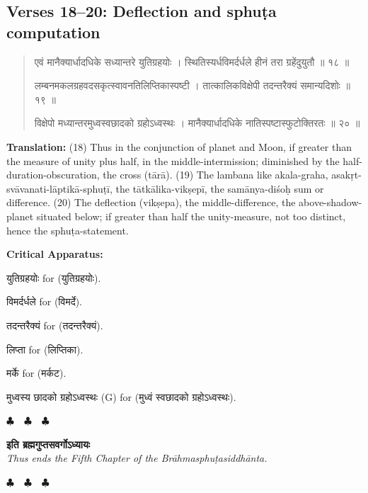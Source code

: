 \documentclass[11pt,a4paper]{article}
\newcommand{\dev}[1]{{\devanagarifont #1}}
\newenvironment{sanskritverse}{%
  \begin{quote}%
  \devanagarifont%
  \setlength{\leftmargin}{2em}%
}{\end{quote}}
\newenvironment{variants}{%
  \small%
  \color{varecolor}%
  \list{}{\leftmargin=2em\itemindent=-1em}%
}{\endlist}
\newcommand{\chapterend}{%
  \begin{center}%
  \textcolor{endmarkcolor}{$\clubsuit$~~$\clubsuit$~~$\clubsuit$}%
  \end{center}%
}
\begin{document}
\subsection*{Verses 18--20: Deflection and sphuṭa computation}

\begin{sanskritverse}
\dev{एवं मानैक्यार्धादधिके सध्यान्तरे युतिग्रहयोः} ।
\dev{स्थितिस्यर्धविमर्दर्धले हीनं तरा ग्रहेंदुयुतौ ॥ १८ ॥}

\dev{लम्बनमकलग्रहवदसकृत्स्वावनतिलिप्तिकास्पष्टी} ।
\dev{तात्कालिकविक्षेपी तदन्तरैक्यं समान्यदिशोः ॥ १९ ॥}

\dev{विक्षेपो मध्यान्तरमुध्वस्वछादको ग्रहोऽध्वस्थः} ।
\dev{मानैक्यार्धादधिके नातिस्पष्टास्फुटोक्तिरतः ॥ २० ॥}
\end{sanskritverse}

\textbf{Translation:} (18) Thus in the conjunction of planet and Moon, if greater 
than the measure of unity plus half, in the middle-intermission; diminished by the 
half-duration-obscuration, the cross (tārā). (19) The lambana like akala-graha, 
asakṛt-svāvanati-lāptikā-sphuṭī, the tātkālika-vikṣepī, the samānya-diśoḥ sum or 
difference. (20) The deflection (vikṣepa), the middle-difference, the above-shadow-planet 
situated below; if greater than half the unity-measure, not too distinct, hence 
the sphuṭa-statement.

\textcolor{varecolor}{\textbf{Critical Apparatus:}}
\begin{variants}
\item[18.1] \dev{युतिग्रहयोः} \dev{for} (\dev{युतिग्रहयोः}).
\item[18.2] \dev{विमर्दर्धले} \dev{for} (\dev{विमर्दे}).
\item[19.1] \dev{तदन्तरैक्यं} \dev{for} (\dev{तदन्तरैक्यं}).
\item[19.2] \dev{लिप्ता} \dev{for} (\dev{लिप्तिका}).
\item[20.1] \dev{मर्के} \dev{for} (\dev{मर्कट}).
\item[20.2] \dev{मुध्वस्य छादको ग्रहोऽध्वस्थः} (G) \dev{for} (\dev{मुध्वं स्वछादको ग्रहोऽध्वस्थः}).
\end{variants}

\vspace{0.5cm}
\chapterend
\begin{center}
\dev{\textbf{इति ब्रह्मगुप्तसवर्गोऽध्यायः}}\\[0.2cm]
\textit{Thus ends the Fifth Chapter of the Brāhmasphuṭasiddhānta.}
\end{center}
\chapterend
\end{document}
